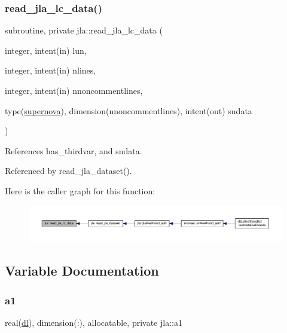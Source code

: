 \subsubsection{\texorpdfstring{read\+\_\+jla\+\_\+lc\+\_\+data()}{read\_jla\_lc\_data()}}
{\footnotesize\ttfamily subroutine, private jla\+::read\+\_\+jla\+\_\+lc\+\_\+data (\begin{DoxyParamCaption}\item[{integer, intent(in)}]{lun,  }\item[{integer, intent(in)}]{nlines,  }\item[{integer, intent(in)}]{nnoncommentlines,  }\item[{type(\mbox{\hyperlink{structjla_1_1supernova}{supernova}}), dimension(nnoncommentlines), intent(out)}]{sndata }\end{DoxyParamCaption})\hspace{0.3cm}{\ttfamily [private]}}



References has\+\_\+thirdvar, and sndata.



Referenced by read\+\_\+jla\+\_\+dataset().

Here is the caller graph for this function\+:
\nopagebreak
\begin{figure}[H]
\begin{center}
\leavevmode
\includegraphics[width=350pt]{namespacejla_aadb5af8cc4301188cd29adc8b94a5bb0_icgraph}
\end{center}
\end{figure}


\subsection{Variable Documentation}
\mbox{\label{namespacejla_af953b413735d88b2fb4acce3a491e092}} 
\subsubsection{\texorpdfstring{a1}{a1}}
{\footnotesize\ttfamily real(\mbox{\hyperlink{namespacejla_a3aa6435b4e08f1d532390186ac608741}{dl}}), dimension(\+:), allocatable, private jla\+::a1\hspace{0.3cm}{\ttfamily [private]}}



